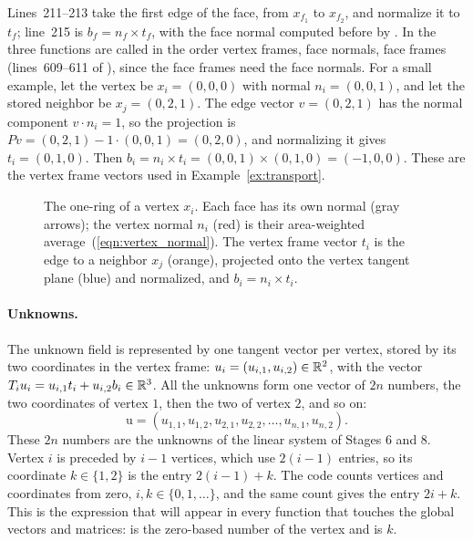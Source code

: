 
Lines~211--213 take the first edge of the face, from $x_{f_1}$ to $x_{f_2}$, and normalize it to $t_f$; line~215 is $b_f = n_f \times t_f$, with the face normal computed before by . In  the three functions are called in the order vertex frames, face normals, face frames (lines~609--611 of ), since the face frames need the face normals.
For a small example, let the vertex be $x_i = (0, 0, 0)$ with normal $n_i = (0, 0, 1)$, and let the stored neighbor be $x_j = (0, 2, 1)$. The edge vector $v = (0, 2, 1)$ has the normal component $v\cdot n_i = 1$, so the projection is $P v = (0, 2, 1) - 1\cdot(0, 0, 1) = (0, 2, 0)$, and normalizing it gives $t_i = (0, 1, 0)$. Then $b_i = n_i\times t_i = (0,0,1)\times(0,1,0) = (-1, 0, 0)$. These are the vertex frame vectors used in Example~\ref{ex:transport}.
\begin{figure}[t]
\centering
{}
\caption{The one-ring of a vertex $x_i$. Each face has its own normal (gray arrows); the vertex normal $n_i$ (red) is their area-weighted average~(\ref{eqn:vertex_normal}). The vertex frame vector $t_i$ is the edge to a neighbor $x_j$ (orange), projected onto the vertex tangent plane (blue) and normalized, and $b_i = n_i \times t_i$.}
\label{fig:one_ring}
\end{figure}

\paragraph{Unknowns.} The unknown field is represented by one tangent vector per vertex, stored by its two coordinates in the vertex frame: $u_i = (u_{i,1}, u_{i,2}) \in \mathbb{R}^2$, with the vector $T_i u_i = u_{i,1} t_i + u_{i,2} b_i \in \mathbb{R}^3$. All the unknowns form one vector of $2n$ numbers, the two coordinates of vertex $1$, then the two of vertex $2$, and so on:
\begin{equation}
\label{eqn:dofs}
\mathrm u = (u_{1,1}, u_{1,2}, u_{2,1}, u_{2,2}, \ldots, u_{n,1}, u_{n,2}).
\end{equation}
These $2n$ numbers are the unknowns of the linear system of Stages 6 and 8. Vertex $i$ is preceded by $i - 1$ vertices, which use $2(i-1)$ entries, so its coordinate $k \in \{1, 2\}$ is the entry $2(i - 1) + k$. The code counts vertices and coordinates from zero, $i, k \in \{0, 1, \ldots\}$, and the same count gives the entry $2 i + k$. This is the expression  that will appear in every function that touches the global vectors and matrices:  is the zero-based number of the vertex and  is $k$.

